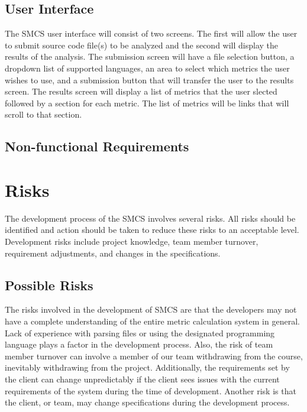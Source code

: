 \documentclass{scrreprt}
\begin{document}
	\section{User Interface}
	The SMCS user interface will consist of two screens. The first will allow the user to submit source code file(s) to be analyzed and the second will display the results of the analysis. The submission screen will have a file selection button, a dropdown list of supported languages, an area to select which metrics the user wishes to use, and a submission button that will transfer the user to the results screen. The results screen will display a list of metrics that the user slected followed by a section for each metric. The list of metrics will be links that will scroll to that section.
	
	\section{Non-functional Requirements}
	\chapter{Risks}
	The development process of the SMCS involves several risks. All risks should be identified and action should be taken to reduce these risks to an acceptable level. Development risks include project knowledge, team member turnover, requirement adjustments, and changes in the specifications.
	\section{Possible Risks}
	The risks involved in the development of SMCS are that the developers may not have a complete understanding of the entire metric calculation system in general. Lack of experience with parsing files or using the designated programming language plays a factor in the development process. Also, the risk of team member turnover can involve a member of our team withdrawing from the course, inevitably withdrawing from the project. Additionally, the requirements set by the client can change unpredictably if the client sees issues with the current requirements of the system during the time of development. Another risk is that the client, or team, may change specifications during the development process.
\end{document}
